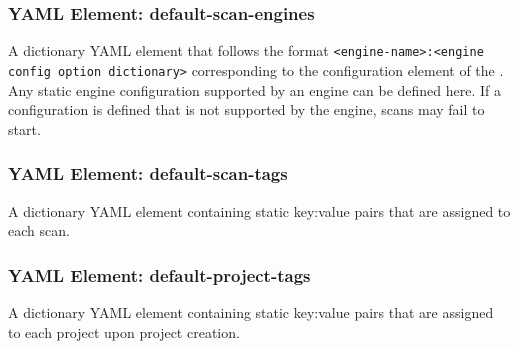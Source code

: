 \subsubsection{YAML Element: default-scan-engines}\label{sec:yaml-scan-config-default-scan-engines}

A dictionary YAML element that follows the format \texttt{<engine-name>:<engine config option dictionary>}
corresponding to the configuration element of the
.
Any static engine configuration supported by an engine can be defined here.  If a configuration is defined that is not supported
by the engine, scans may fail to start.

\subsubsection{YAML Element: default-scan-tags}\label{sec:yaml-scan-config-default-scan-tags}
A dictionary YAML element containing static key:value pairs that are assigned to each scan.

\subsubsection{YAML Element: default-project-tags}\label{sec:yaml-scan-config-default-project-tags}
A dictionary YAML element containing static key:value pairs that are assigned\\to each project upon project creation.

